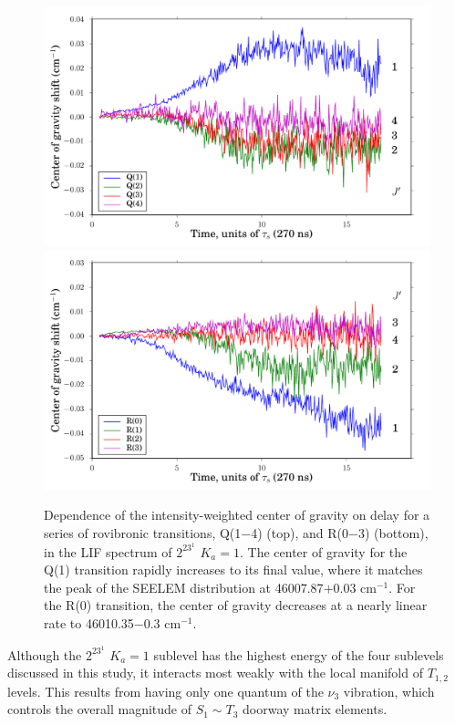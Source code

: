 \documentclass[12pt]{mitthesis}
\newcommand{\rcm}{cm$^{-1}$}
\newcommand{\Ka}[1]{$K_a\!\!=\!#1$}
\begin{document}
\begin{figure}
  \caption{Dependence of the intensity-weighted center of gravity on
    delay for a series of rovibronic transitions, Q(1$-$4) (top), and
    R(0$-$3) (bottom), in the LIF spectrum of $2^23^1$ \Ka{1}.  The
    center of gravity for the Q(1) transition rapidly increases to its
    final value, where it matches the peak of the SEELEM distribution
    at 46007.87$+$0.03 \rcm.  For the R(0) transition, the center of
    gravity decreases at a nearly linear rate to 46010.35$-$0.3 \rcm.}
  \label{fig:2231-cog-delay}
  \centering
  \vspace{5mm}
  \includegraphics[width=6in]{2231-q1234-cog-delay.pdf}
  \includegraphics[width=6in]{2231-r0123-cog-delay.pdf}
\end{figure}


Although the $2^23^1$ \Ka{1} sublevel has the highest energy of the
four sublevels discussed in this study, it interacts most weakly with
the local manifold of $T_{1,2}$ levels.  This results from having only
one quantum of the $\nu_3$ vibration, which controls the overall
magnitude of $S_1 \sim T_3$ doorway matrix elements.
\end{document}
